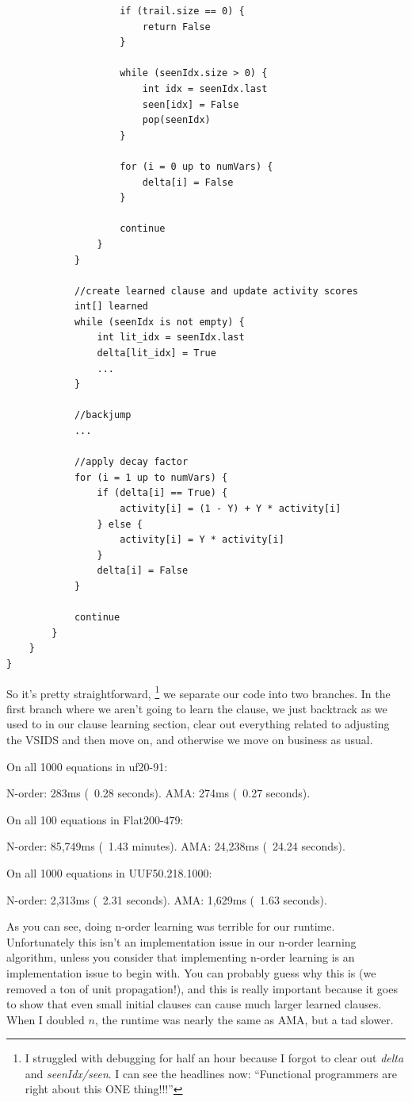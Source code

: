 \documentclass[../main.tex]{subfiles}
\begin{document}
\begin{lstlisting}
                    if (trail.size == 0) {
                        return False
                    }

                    while (seenIdx.size > 0) {
                        int idx = seenIdx.last
                        seen[idx] = False
                        pop(seenIdx)
                    }

                    for (i = 0 up to numVars) {
                        delta[i] = False
                    }

                    continue
                }
            }

            //create learned clause and update activity scores
            int[] learned
            while (seenIdx is not empty) {
                int lit_idx = seenIdx.last
                delta[lit_idx] = True
                ...
            }

            //backjump
            ...

            //apply decay factor
            for (i = 1 up to numVars) {
                if (delta[i] == True) {
                    activity[i] = (1 - Y) + Y * activity[i]
                } else {
                    activity[i] = Y * activity[i]
                }
                delta[i] = False
            }

            continue
        }
    }
}
\end{lstlisting}
\noindent
So it's pretty straightforward,
\footnote{I struggled with debugging for half an hour because I forgot to clear out
\textit{delta} and \textit{seenIdx/seen}. I can see the headlines now: 
``Functional programmers are right about this ONE thing!!!''}
we separate our code into two branches. In the first branch where we aren't going to 
learn the clause, we just backtrack as we used to in our clause learning section, clear 
out everything related to adjusting the VSIDS and then move on, and otherwise we move on 
business as usual.

\begin{FVerbatim}
On all 1000 equations in uf20-91:

N-order:   283ms (~0.28 seconds).
AMA:       274ms (~0.27 seconds).

On all 100 equations in Flat200-479:

N-order:   85,749ms (~1.43 minutes).
AMA:       24,238ms (~24.24 seconds).

On all 1000 equations in UUF50.218.1000:

N-order:   2,313ms (~2.31 seconds).
AMA:       1,629ms (~1.63 seconds).
\end{FVerbatim}
\noindent
As you can see, doing n-order learning was terrible for our runtime. Unfortunately 
this isn't an implementation issue in our n-order learning algorithm, unless you 
consider that implementing n-order learning is an implementation issue to begin with.
You can probably guess why this is (we removed a ton of unit propagation!), and this 
is really important because it goes to show that even small initial clauses can cause 
much larger learned clauses. When I doubled $n$, the runtime was nearly the same as 
AMA, but a tad slower. 
\end{document}
